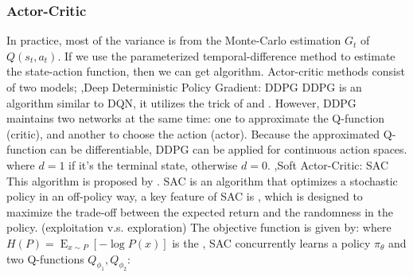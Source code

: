 \documentclass[10pt]{report}
\begin{document}
\subsubsection{Actor-Critic}
In practice, most of the variance is from the Monte-Carlo estimation $G_t$ of $Q(s_t,a_t)$. If we use the parameterized temporal-difference method to
estimate the state-action function, then we can get  algorithm. Actor-critic methods consist of two models;
\sep{Deep Deterministic Policy Gradient: DDPG}
DDPG is an algorithm similar to DQN, it utilizes the trick of  and . However,
DDPG maintains two networks at the same time: one to approximate the Q-function (critic), and another to choose the action (actor).
Because the approximated Q-function can be differentiable, DDPG can be applied for continuous action spaces.
where $d=1$ if it's the terminal state, otherwise $d=0$.
\sep{Soft Actor-Critic: SAC}
This algorithm is proposed by \cite{haarnoja2018soft}. SAC is an algorithm that optimizes a stochastic policy in an off-policy way, a key feature
of SAC is , which is designed to maximize the trade-off between the expected return and the randomness in the policy. (exploitation v.s. exploration)
The objective function is given by:
where $H(P)=\operatorname*{E}_{x\sim P}\left[-\log P(x)\right]$ is the , SAC concurrently learns a policy $\pi_\theta$ and two Q-functions $Q_{\phi_1},Q_{\phi_2}$:
\end{document}
